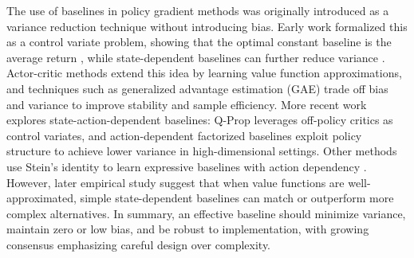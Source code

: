 \documentclass{article}
\makeatletter
\theoremstyle{plain}
\theoremstyle{definition}
\theoremstyle{remark}
\newlength{\secvspace}
\let\originalsubsection\subsection
\renewcommand{\subsection}{\@ifstar{\@subsectionstar}{\@subsectionnormal}}
\newcommand{\@subsectionnormal}[1]{%
  \vspace{-\secvspace}%
  \originalsubsection{#1}%
  \vspace{-\secvspace}%
}
\newcommand{\@subsectionstar}[1]{%
  \vspace{-\secvspace}%
  \originalsubsection*{#1}%
  \vspace{-\secvspace}%
}
\makeatother
\begin{document}
The use of baselines in policy gradient methods was originally introduced \citep{williams1992simple} as a variance reduction technique without introducing bias. Early work formalized this as a control variate problem, showing that the optimal constant baseline is the average return \citep{weaver2013optimal}, while state-dependent baselines can further reduce variance \citep{greensmith2004variance}. Actor-critic methods \citep{barto1989learning} extend this idea by learning value function approximations, and techniques such as generalized advantage estimation (GAE) \citep{schulman2015high} trade off bias and variance to improve stability and sample efficiency. More recent work explores state-action-dependent baselines: Q-Prop \citep{gu2016q} leverages off-policy critics as control variates, and action-dependent factorized baselines \citep{wu2018variance} exploit policy structure to achieve lower variance in high-dimensional settings. Other methods use Stein’s identity to learn expressive baselines with action dependency \citep{liu2017action}. However, later empirical study \citep{tucker2018mirage} suggest that when value functions are well-approximated, simple state-dependent baselines can match or outperform more complex alternatives. In summary, an effective baseline should minimize variance, maintain zero or low bias, and be robust to implementation, with growing consensus emphasizing careful design over complexity.

\subsection{Stein's Paradox}
\end{document}

